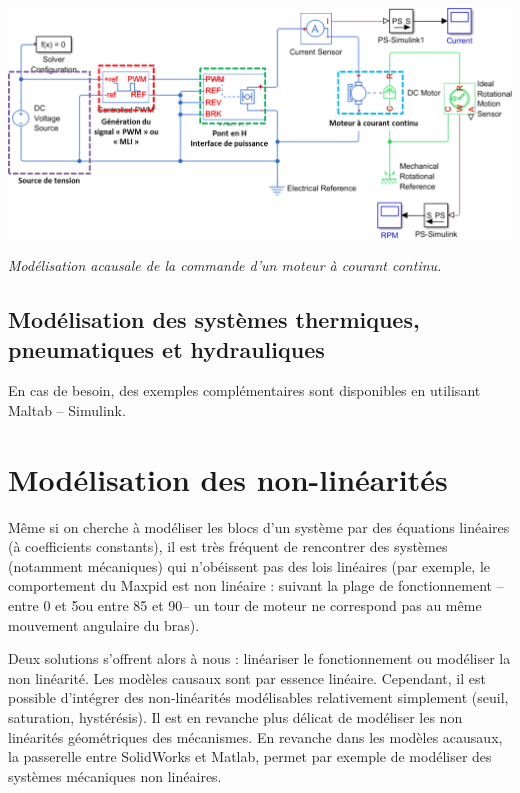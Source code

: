 \documentclass[10pt,fleqn]{article} %
\begin{document}
\begin{center}
\includegraphics[width=\linewidth]{images/MoteurCC}

\textit{Modélisation acausale de la commande d'un moteur à courant continu.}
\end{center}


\subsection{Modélisation des systèmes thermiques, pneumatiques et hydrauliques}
En cas de besoin, des exemples complémentaires sont disponibles en utilisant Maltab -- Simulink.


\section{Modélisation des non-linéarités}

Même si on cherche à modéliser les blocs d'un système par des équations linéaires (à coefficients constants), il est très fréquent de rencontrer des systèmes (notamment mécaniques) qui n'obéissent pas des lois linéaires (par exemple, le comportement du Maxpid est non linéaire : suivant la plage de fonctionnement -- entre 0 et 5\textdegree ou entre 85 et 90\textdegree -- un tour de moteur ne correspond pas au même mouvement angulaire du bras). 

Deux solutions s'offrent alors à nous : linéariser le fonctionnement ou modéliser la non linéarité. 
Les modèles causaux sont par essence linéaire. Cependant, il est possible d'intégrer des non-linéarités modélisables relativement simplement (seuil, saturation, hystérésis). Il est en revanche plus délicat de modéliser les non linéarités géométriques des mécanismes. 
En revanche dans les modèles acausaux, la passerelle entre SolidWorks et Matlab, permet par exemple de modéliser des systèmes mécaniques non linéaires.
\end{document}
